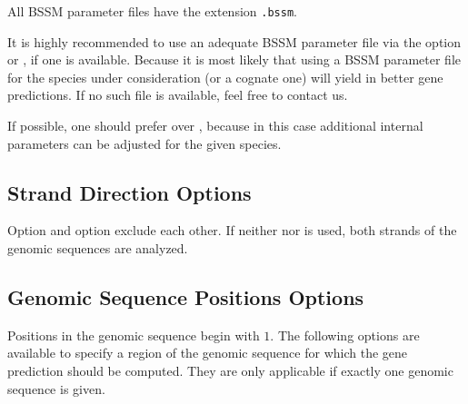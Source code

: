 \documentclass[11pt,a4paper,titlepage]{article}
\begin{document}
All BSSM parameter files have the extension \texttt{.bssm}.

It is highly recommended to use an adequate BSSM parameter file via the option
 or , if one is available.
Because it is most likely that using a BSSM parameter file for the species under
consideration (or a cognate one) will yield in better gene predictions.
If no such file is available, feel free to contact us.

If possible, one should prefer  over ,
because in this case additional internal parameters can be adjusted for the given species.




\subsection{Strand Direction Options}
\begin{Justshowoptions}
\end{Justshowoptions}

Option  and option  exclude each other.
If neither  nor  is used, both strands of the genomic sequences are analyzed.


\subsection{Genomic Sequence Positions Options}
Positions in the genomic sequence begin with $1$. The following options are available to specify a region of the genomic sequence for which the gene prediction should be computed. They are only applicable if exactly one genomic sequence is given.
\begin{Justshowoptions}



\end{Justshowoptions}
\end{document}
